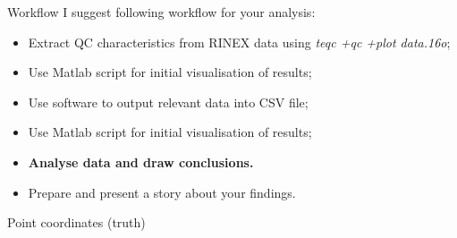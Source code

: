 \documentclass[11pt]{beamer}
\begin{document}
	\begin{frame}{Workflow}
		I suggest following workflow for your analysis:
		
		\begin{itemize}
			\item Extract QC characteristics from RINEX data using \textit{ teqc +qc +plot data.16o};
			\item Use Matlab script for initial visualisation of results;
			\item Use software to output relevant data into CSV file;
			\item Use Matlab script for initial visualisation of results;
			\item \textbf{Analyse data and draw conclusions.}
			\item \alert{Prepare and present a story about your findings.}
		\end{itemize}
	\end{frame}

{ 

\begin{frame}{Point coordinates (truth)}
	\begin{table}
		\centering
		\begin{minipage}[t]{\textwidth}%
			\caption{OSGB coordinates for the Project 1}
		\end{minipage}
	\end{table}
	
\end{frame}
} %
\end{document}
